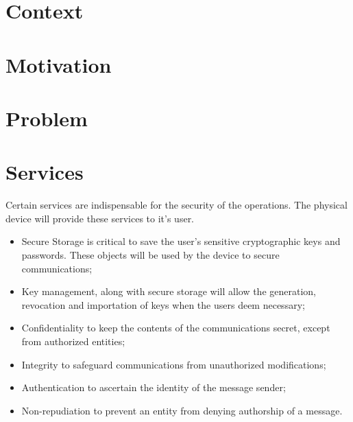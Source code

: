 \cleardoublepage
\label{chap:intro}


\section{Context} \label{chap:intro:context}

\section{Motivation} \label{chap:intro:motivation}

\section{Problem} \label{chap:intro:problem}

\section{Services} \label{chap:intro:services}

Certain services are indispensable for the security of the operations. The physical device will provide these services to it's user.

\begin{itemize}
    \item Secure Storage is critical to save the user's sensitive cryptographic keys and passwords. These objects will be used by the device to secure communications;
    \item Key management, along with secure storage will allow the generation, revocation and importation of keys when the users deem necessary;
    \item Confidentiality to keep the contents of the communications secret, except from authorized entities;
    \item Integrity to safeguard communications from unauthorized modifications;
    \item Authentication to ascertain the identity of the message sender;
    \item Non-repudiation to prevent an entity from denying authorship of a message.
\end{itemize}

